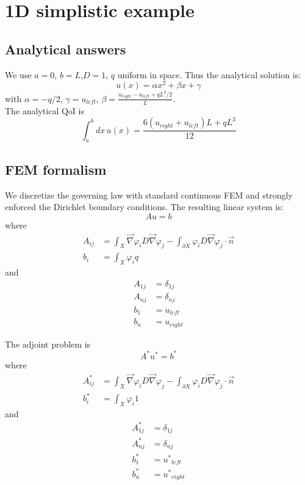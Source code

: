 \documentclass[11pt]{article}
\newcommand{\vn}{\vec{n}}
\newcommand{\grad}{\vec{\nabla}}
\newcommand{\be}{\begin{equation}}
\newcommand{\ee}{\end{equation}}
\newcommand{\us}{{u^\ast}}
\begin{document}
\section{1D simplistic example}

\subsection{Analytical answers}
We use $a=0$, $b=L$,$D=1$, $q$ uniform in space. Thus the analytical solution is:
\begin{equation}
u(x)= \alpha x^2 + \beta x + \gamma
\end{equation}
with $\alpha = -q/2$, $\gamma=u_{left}$, $\beta=\frac{u_{right}-u_{left}+qL^2/2}{L}$.\\
The analytical QoI is
\begin{equation}
\int_a^b dx \, u(x) =\frac{6(u_{right}+u_{left})L+qL^3}{12}
\end{equation}

\subsection{FEM formalism}
We discretize the governing law with standard continuous FEM and strongly enforced the Dirichlet boundary conditions. 
The resulting linear system is:
\be
Au=b
\ee
where
\begin{align}
A_{ij} &= \int_X \grad \varphi_i D \grad \varphi_j  - \int_{\partial X} \varphi_i D \grad \varphi_j \cdot \vn \\
b_i    &=  \int_X \varphi_i q 
\end{align}
and
\begin{align}
A_{1j} &= \delta_{1j}  \\
A_{nj} &= \delta_{nj}  \\
b_1    &=  u_{left}    \\
b_n    &=  u_{right}
\end{align}

The adjoint problem is
\be
A^\ast\us=b^\ast
\ee
where
\begin{align}
A^\ast_{ij} &= \int_X \grad \varphi_i D \grad \varphi_j  - \int_{\partial X} \varphi_i D \grad \varphi_j \cdot \vn \\
b^\ast_i    &=  \int_X \varphi_i 1 
\end{align}
and
\begin{align}
A^\ast_{1j} &= \delta_{1j}  \\
A^\ast_{nj} &= \delta_{nj}  \\
b^\ast_1    &=  \us_{left}    \\
b^\ast_n    &=  \us_{right}
\end{align}
\end{document}
